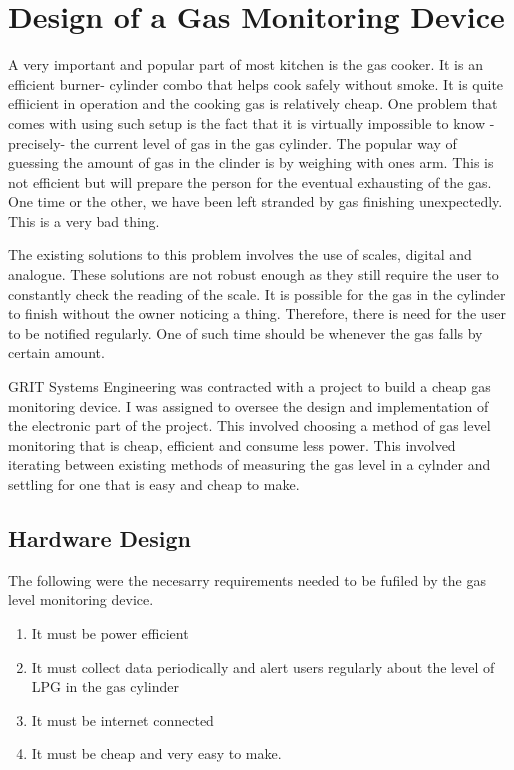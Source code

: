 
\section{Design of a Gas Monitoring Device} 
A very important and popular part of most kitchen is the gas cooker. It is an efficient burner- cylinder combo that helps cook safely without smoke. It is quite effiicient in operation and the cooking gas is relatively cheap. One problem that comes with using such setup is the fact that it is virtually impossible to know -precisely- the current level of gas in the gas cylinder. The popular way of guessing the amount of gas in the clinder is by weighing with ones arm. This is not efficient but will prepare the person for the eventual exhausting of the gas. One time or the other, we have been left stranded by gas finishing unexpectedly. This is a very bad thing.

The existing solutions to this problem involves the use of scales, digital and analogue. These solutions are not robust enough as they still require the user to constantly check the reading of the scale. It is possible for the gas in the cylinder to finish without the owner noticing a thing. Therefore, there is need for the user to be notified regularly. One of such time should be whenever the gas falls by certain amount. 

GRIT Systems Engineering was contracted with a project to build a cheap gas monitoring device. I was assigned to oversee the design and implementation of the electronic part of the project. This involved choosing a method of gas level monitoring that is cheap, efficient and consume less power. This involved iterating between existing methods of measuring the gas level in a cylnder and settling for one that is easy and cheap to make.


\subsection{Hardware Design}
The following were the necesarry requirements needed to be fufiled by the gas level monitoring device.
\begin{enumerate}
\item It must be power efficient
\item It must collect data periodically and alert users regularly about the level of LPG in the gas cylinder
\item It must be internet connected 
\item It must be cheap and very easy to make.
\end{enumerate}

